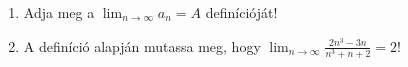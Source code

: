 \documentclass[11pt]{scrartcl}
\begin{document}
\begin{enumerate}
	\item Adja meg a $\lim_{n \to \infty} a_n = A$ definícióját!

	\item A definíció alapján mutassa meg, hogy
	      \(\displaystyle \lim_{n \to \infty} \frac{2n^3 - 3n}{n^3 + n + 2} = 2\)!
\end{enumerate}
\end{document}
